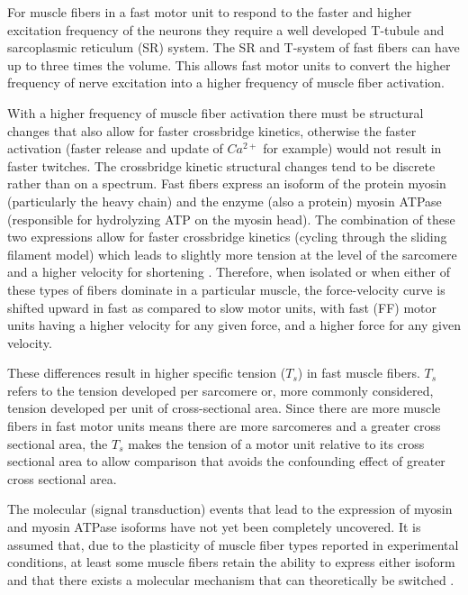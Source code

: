 For muscle fibers in a fast motor unit to respond to the faster and higher excitation frequency of the neurons they require a well developed T-tubule and sarcoplasmic reticulum (SR) system. The SR and T-system of fast fibers can have up to three times the volume. This allows fast motor units to convert the higher frequency of nerve excitation into a higher frequency of muscle fiber activation.

With a higher frequency of muscle fiber activation there must be structural changes that also allow for faster crossbridge kinetics, otherwise the faster activation (faster release and update of $Ca^{2+}$ for example) would not result in faster twitches. The crossbridge kinetic structural changes tend to be discrete rather than on a spectrum.\footnotemark{} Fast fibers express an isoform of the protein myosin (particularly the heavy chain) and the enzyme (also a protein) myosin ATPase (responsible for hydrolyzing ATP on the myosin head). The combination of these two expressions allow for faster crossbridge kinetics (cycling through the sliding filament model) which leads to slightly more tension at the level of the sarcomere and a higher velocity for shortening \cite{larsson_maximum_1993, schiaffino_molecular_1996}. Therefore, when isolated or when either of these types of fibers dominate in a particular muscle, the force-velocity curve is shifted upward in fast as compared to slow motor units, with fast (FF) motor units having a higher velocity for any given force, and a higher force for any given velocity. 

These differences result in higher specific tension ($T_s$) in fast muscle fibers. $T_s$ refers to the tension developed per sarcomere or, more commonly considered, tension developed per unit of cross-sectional area. Since there are more muscle fibers in fast motor units means there are more sarcomeres and a greater cross sectional area, the $T_s$ makes the tension of a motor unit relative to its cross sectional area to allow comparison that avoids the confounding effect of greater cross sectional area.

The molecular (signal transduction) events that lead to the expression of myosin and myosin ATPase isoforms have not yet been completely uncovered.\footnotemark{} It is assumed that, due to the plasticity of muscle fiber types reported in experimental conditions, at least some muscle fibers retain the ability to express either isoform and that there exists a molecular mechanism that can theoretically be switched \cite{schiaffino_molecular_1996}.

